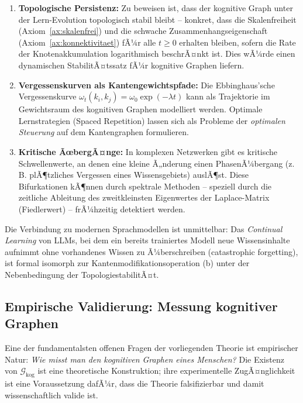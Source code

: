 ﻿\documentclass[12pt,a4paper]{article}
\theoremstyle{plain}
\theoremstyle{definition}
\theoremstyle{remark}
\newcommand{\GG}{\mathcal{G}}
\begin{document}
\begin{enumerate}
  \item \textbf{Topologische Persistenz:} Zu beweisen ist, dass der kognitive Graph unter der Lern-Evolution topologisch stabil bleibt -- konkret, dass die Skalenfreiheit (Axiom~\ref{ax:skalenfrei}) und die schwache Zusammenhangseigenschaft (Axiom~\ref{ax:konnektivitaet}) fÃ¼r alle $t \geq 0$ erhalten bleiben, sofern die Rate der Knotenakkumulation logarithmisch beschrÃ¤nkt ist. Dies wÃ¼rde einen dynamischen StabilitÃ¤tssatz fÃ¼r kognitive Graphen liefern.

  \item \textbf{Vergessenskurven als Kantengewichtspfade:} Die Ebbinghaus'sche Vergessenskurve $\omega_t(k_i, k_j) = \omega_0 \exp(-\lambda t)$ kann als Trajektorie im Gewichtsraum des kognitiven Graphen modelliert werden. Optimale Lernstrategien (Spaced Repetition) lassen sich als Probleme der \emph{optimalen Steuerung} auf dem Kantengraphen formulieren.

  \item \textbf{Kritische ÃœbergÃ¤nge:} In komplexen Netzwerken gibt es kritische Schwellenwerte, an denen eine kleine Ã„nderung einen PhasenÃ¼bergang (z.\,B. plÃ¶tzliches Vergessen eines Wissensgebiets) auslÃ¶st. Diese Bifurkationen kÃ¶nnen durch spektrale Methoden -- speziell durch die zeitliche Ableitung des zweitkleinsten Eigenwertes der Laplace-Matrix (Fiedlerwert) -- frÃ¼hzeitig detektiert werden.
\end{enumerate}

Die Verbindung zu modernen Sprachmodellen ist unmittelbar: Das \emph{Continual Learning} von LLMs, bei dem ein bereits trainiertes Modell neue Wissensinhalte aufnimmt ohne vorhandenes Wissen zu Ã¼berschreiben (catastrophic forgetting), ist formal isomorph zur Kantenmodifikationsoperation (b) unter der Nebenbedingung der TopologiestabilitÃ¤t.


\subsection{Empirische Validierung: Messung kognitiver Graphen}
\label{subsec:messung}

Eine der fundamentalsten offenen Fragen der vorliegenden Theorie ist empirischer Natur: \emph{Wie misst man den kognitiven Graphen eines Menschen?} Die Existenz von $\GG_{\text{kog}}$ ist eine theoretische Konstruktion; ihre experimentelle ZugÃ¤nglichkeit ist eine Voraussetzung dafÃ¼r, dass die Theorie falsifizierbar und damit wissenschaftlich valide ist.
\end{document}
